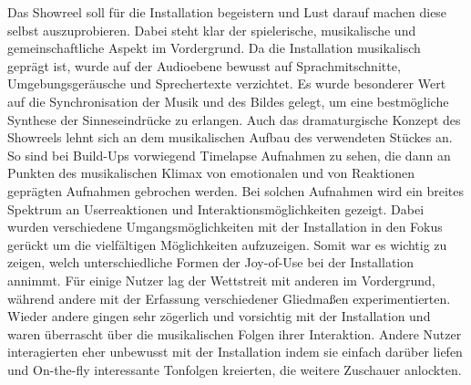 Das Showreel soll für die Installation begeistern und Lust darauf machen diese selbst auszuprobieren. Dabei steht klar der spielerische, musikalische und gemeinschaftliche Aspekt im Vordergrund. Da die Installation musikalisch geprägt ist, wurde auf der Audioebene bewusst auf Sprachmitschnitte, Umgebungsgeräusche und Sprechertexte verzichtet. Es wurde besonderer Wert auf die Synchronisation der Musik und des Bildes gelegt, um eine bestmögliche Synthese der Sinneseindrücke zu erlangen. Auch das dramaturgische Konzept des Showreels lehnt sich an dem musikalischen Aufbau des verwendeten Stückes an. So sind bei Build-Ups vorwiegend Timelapse Aufnahmen zu sehen, die dann an Punkten des musikalischen Klimax von emotionalen und von Reaktionen geprägten Aufnahmen gebrochen werden. Bei solchen Aufnahmen wird ein breites Spektrum an Userreaktionen und Interaktionsmöglichkeiten gezeigt. Dabei wurden verschiedene Umgangsmöglichkeiten mit der Installation in den Fokus gerückt um die vielfältigen Möglichkeiten aufzuzeigen. Somit war es wichtig zu zeigen, welch unterschiedliche Formen der Joy-of-Use bei der Installation annimmt. Für einige Nutzer lag der Wettstreit mit anderen im Vordergrund, während andere mit der Erfassung verschiedener Gliedmaßen experimentierten. Wieder andere gingen sehr zögerlich und vorsichtig mit der Installation und waren überrascht über die musikalischen Folgen ihrer Interaktion. Andere Nutzer interagierten eher unbewusst mit der Installation indem sie einfach darüber liefen und On-the-fly interessante Tonfolgen kreierten, die weitere Zuschauer anlockten.